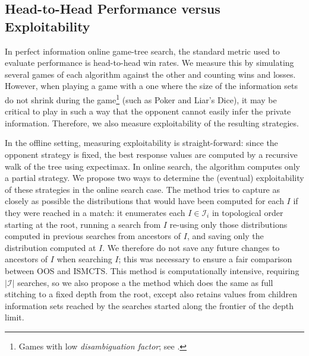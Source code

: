 \documentclass[letterpaper]{article}
\newcommand{\cI}{\mathcal{I}}
\newcommand{\defword}[1]{\textbf{\boldmath{#1}}}
\newcounter{mlNoteCounter}
\newcommand{\mlnote}[1]{{\scriptsize \color{darkgreen} $\blacksquare$ \refstepcounter{mlNoteCounter}\textsf{[ML]$_{\arabic{mlNoteCounter}}$:{#1}}}}
\begin{document}
\subsection{Head-to-Head Performance versus Exploitability} 


In perfect information online game-tree search, the standard metric used to evaluate performance 
is head-to-head win rates. We measure this by simulating several games of each algorithm against the other
and counting wins and losses. 
However, when playing a game with a 
one where the size of the information sets do not shrink during the 
game\footnote{Games with low {\it disambiguation factor}; see \cite{Long10Understanding}.} (such as Poker and Liar's Dice), 
it may be critical to play in such a way that the opponent cannot easily infer the private information. Therefore, 
we also measure exploitability of the resulting strategies. 

In the offline setting, measuring exploitability is straight-forward: since the opponent strategy is fixed, the best 
response values are computed by a recursive walk of the tree using expectimax. In online search, the algorithm computes only 
a partial strategy. We propose two ways to determine the (eventual) exploitability of these strategies in the online search
case. The \defword{full stitching} method tries to capture as closely as possible the distributions that would have been computed 
for each $I$ if they were reached in a match: it enumerates each $I \in \cI_i$ in topological order starting at the root, 
running a search from $I$ re-using only those distributions computed in previous searches from ancestors of $I$, and saving 
only the distribution computed at $I$. 
We therefore do not save any future changes to ancestors of $I$ when searching $I$; this was necessary to ensure 
a fair comparison between OOS and ISMCTS. This method is computationally intensive, requiring $|\cI|$ searches, so we also propose 
a the \defword{partial stitching} method which does the same as full stitching to a fixed depth from the root, except also 
retains values from children information sets reached by the searches started along the frontier of the depth limit.
\end{document}
